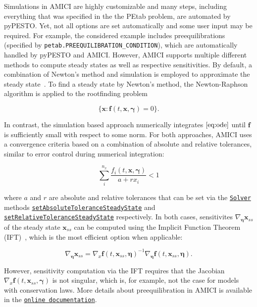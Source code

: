 \documentclass[11pt]{article}
\newcommand{\dims}[1]{{n_{#1}}}
\begin{document}
    Simulations in AMICI are highly customizable and many steps, including
everything that was specified in the the PEtab problem, are automated by
pyPESTO. Yet, not all options are set automatically and some user input
may be required. For example, the considered example includes
preequilibrations (specified by
\texttt{petab.PREEQUILIBRATION\_CONDITION}), which are automatically
handled by pyPESTO and AMICI. However, AMICI supports multiple different
methods to compute steady states as well as respective sensitivities. By
default, a combination of Newton's method and simulation is employed to
approximate the steady state~\cite{2754712/LVNQBT95}. To find a steady
state by Newton's method, the Newton-Raphson algorithm is applied to the
rootfinding problem

\[ \{\textbf{x}: \textbf{f}(t,\textbf{x},\boldsymbol{\gamma}) = 0\}. \]

In contrast, the simulation based approach numerically integrates
\(\eqref{eq:ode}\) until \(\textbf{f}\) is sufficiently small with
respect to some norm. For both approaches, AMICI uses a convergence
criteria based on a combination of absolute and relative tolerances,
similar to error control during numerical integration:

\[ \sum_i^{\dims{x}} \frac{f_i(t,\textbf{x},\boldsymbol{\gamma})}{a + r x_i} < 1\]

where \(a\) and \(r\) are absolute and relative tolerances that can be
set via the
\href{https://amici.readthedocs.io/en/latest/generated/amici.amici.Solver.html\#amici.amici.Solver}{\texttt{Solver}}
methods
\href{https://amici.readthedocs.io/en/latest/generated/amici.amici.Solver.html\#amici.amici.Solver.setAbsoluteToleranceSteadyState}{\texttt{setAbsoluteToleranceSteadyState}}
and
\href{https://amici.readthedocs.io/en/latest/generated/amici.amici.Solver.html\#amici.amici.Solver.setRelativeToleranceSteadyState}{\texttt{setRelativeToleranceSteadyState}}
respectively. In both cases, sensitivites
\(\nabla_{\boldsymbol{\eta}}\textbf{x}_{ss}\) of the steady state
\(\textbf{x}_{ss}\) can be computed using the Implicit Function Theorem
(IFT)~\cite{2754712/6AWGLSM9}, which is the most efficient option when
applicable:

\[ \nabla_{\boldsymbol{\eta}}\textbf{x}_{ss} = \nabla_x\textbf{f}(t,\textbf{x}_{ss},\boldsymbol{\eta})^{-1}\nabla_{\boldsymbol{\eta}}\textbf{f}(t,\textbf{x}_{ss},\boldsymbol{\eta}) . \]

However, sensitivity computation via the IFT requires that the Jacobian
\(\nabla_x\textbf{f}(t,\textbf{x}_{ss},\boldsymbol{\gamma})\) is not
singular, which is, for example, not the case for models with
conservation laws. More details about preequilibration in AMICI is
available in the
\href{https://amici.readthedocs.io/en/latest/ExampleEquilibrationLogic.html}{\texttt{online\ documentation}}.
\end{document}
